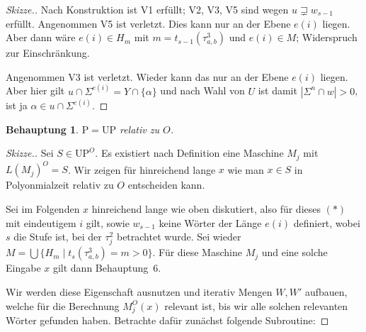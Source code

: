\documentclass[nofonts]{uebung}
\newtheorem{claim}[theorem]{Behauptung}
\def\P{\ensuremath{\mathrm{P}}}
\def\UP{\ensuremath{\mathrm{UP}}}
\begin{document}
\begin{proof}[Skizze.]
    Nach Konstruktion ist V1 erfüllt; V2, V3, V5 sind wegen $u\sqsupsetneq w_{s-1}$ erfüllt. Angenommen V5 ist verletzt. Dies kann nur an der Ebene $e(i)$ liegen. Aber dann wäre $e(i)\in H_{m}$ mit $m=t_{s-1}(\tau^3_{a,b})$ und $e(i)\in M$; Widerspruch zur Einschränkung.

    Angenommen V3 ist verletzt.
    Wieder kann das nur an der Ebene $e(i)$ liegen.
    Aber hier gilt $u\cap\Sigma^{e(i)}=Y\cap\{\alpha\}$ und nach Wahl von $U$ ist damit $|\Sigma^{n}\cap w|>0$, ist ja $\alpha\in u\cap\Sigma^{e(i)}$.
\end{proof}

\begin{claim}
    $\P=\UP$ relativ zu $O$.
\end{claim}
\begin{proof}[Skizze.]
    Sei $S\in \UP^O$. Es existiert nach Definition eine Maschine $M_j$ mit $L(M_j)^O=S$.
    Wir zeigen für hinreichend lange $x$ wie man $x\in S$ in Polyonmialzeit relativ zu $O$ entscheiden kann.
    
    Sei im Folgenden $x$ hinreichend lange wie oben diskutiert, also für dieses $(\ast)$ mit eindeutigem $i$ gilt, sowie $w_{s-1}$ keine Wörter der Länge $e(i)$ definiert, wobei $s$ die Stufe ist, bei der $\tau^2_j$ betrachtet wurde.
    Sei wieder $M=\bigcup \{ H_m \mid t_s(\tau^3_{a,b})=m>0 \}$.
    Für diese Maschine $M_j$ und eine solche Eingabe $x$ gilt dann Behauptung~6.

    Wir werden diese Eigenschaft ausnutzen und iterativ Mengen $W, W'$ aufbauen, welche für die Berechnung $M_j^O(x)$ relevant ist, bis wir alle solchen relevanten Wörter gefunden haben.
    Betrachte dafür zunächst folgende Subroutine:


\end{proof}
\end{document}
